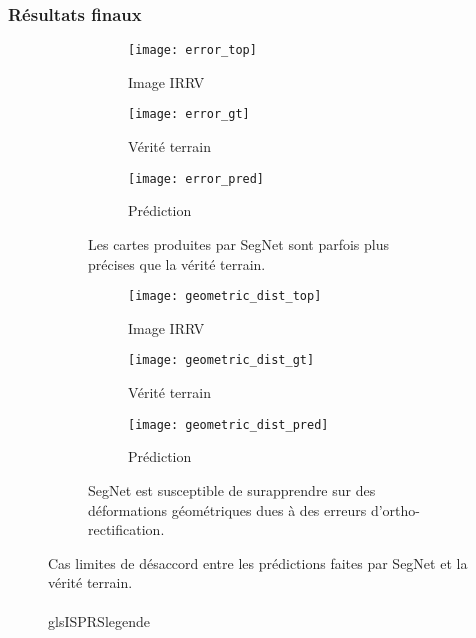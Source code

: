 \subsubsection{Résultats finaux}

\begin{figure}[t]
	\captionsetup[subfigure]{singlelinecheck=off,justification=centering}
	\begin{subfigure}{0.5\textwidth}
		\begin{subfigure}[t]{0.3\textwidth}
	    	\texttt{[image: error\_top]}
	        \caption*{Image \gls{IRRV}}
	    \end{subfigure}
	    \begin{subfigure}[t]{0.3\textwidth}
	    	\texttt{[image: error\_gt]}
	        \caption*{Vérité terrain}
	    \end{subfigure}
	    \begin{subfigure}[t]{0.3\textwidth}
	    	\texttt{[image: error\_pred]}
	        \caption*{Prédiction}
	    \end{subfigure}
	    \caption{Les cartes produites par SegNet sont parfois plus précises que la vérité terrain.}
	    \label{fig:unprecise_transition}
	\end{subfigure}
	\begin{subfigure}{0.5\textwidth}
		\begin{subfigure}[t]{0.3\textwidth}
	    	\texttt{[image: geometric\_dist\_top]}
	        \caption*{Image \gls{IRRV}}
	    \end{subfigure}
	    \begin{subfigure}[t]{0.3\textwidth}
	    	\texttt{[image: geometric\_dist\_gt]}
	        \caption*{Vérité terrain}
	    \end{subfigure}
	    \begin{subfigure}[t]{0.3\textwidth}
	    	\texttt{[image: geometric\_dist\_pred]}
	        \caption*{Prédiction}
	    \end{subfigure}
	    \caption{SegNet est susceptible de surapprendre sur des déformations géométriques dues à des erreurs d'ortho-rectification.}
	    \label{fig:geometric_dist}
	\end{subfigure}
	\caption{Cas limites de désaccord entre les prédictions faites par SegNet et la vérité terrain.\\
	\\gls{ISPRS}legende}
\end{figure}

